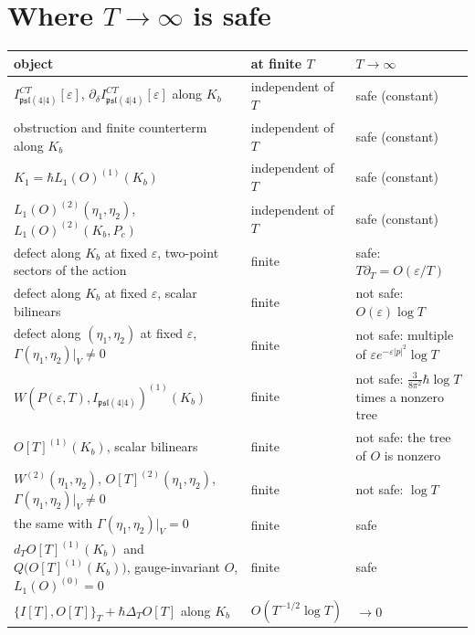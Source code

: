 \section{Where $T\to\infty$ is safe}

\begin{proposition}
\label{prop:kj-Tsafe}
\begin{center}
\begin{tabular}{l|l|l}
object & at finite $T$ & $T\to\infty$ \\
\hline
$I^{CT}_{\mathfrak{psl}(4|4)}[\varepsilon]$, $\partial_\delta I^{CT}_{\mathfrak{psl}(4|4)}[\varepsilon]$ along $K_b$ & independent of $T$ & safe (constant) \\
obstruction and finite counterterm along $K_b$ & independent of $T$ & safe (constant) \\
$K_1=\hbar L_1(O)^{(1)}(K_b)$ & independent of $T$ & safe (constant) \\
$L_1(O)^{(2)}(\eta_1,\eta_2)$, $L_1(O)^{(2)}(K_b,P_c)$ & independent of $T$ & safe (constant) \\
defect along $K_b$ at fixed $\varepsilon$, two-point sectors of the action & finite & safe: $T\partial_T=O(\varepsilon/T)$ \\
defect along $K_b$ at fixed $\varepsilon$, scalar bilinears & finite & not safe: $O(\varepsilon)\log T$ \\
defect along $(\eta_1,\eta_2)$ at fixed $\varepsilon$, $\Gamma(\eta_1,\eta_2)|_V\neq0$ & finite & not safe: multiple of $\varepsilon e^{-\varepsilon|p|^2}\log T$ \\
$W(P(\varepsilon,T),I_{\mathfrak{psl}(4|4)})^{(1)}(K_b)$ & finite & not safe: $\tfrac{3}{8\pi^2}\hbar\log T$ times a nonzero tree \\
$O[T]^{(1)}(K_b)$, scalar bilinears & finite & not safe: the tree of $O$ is nonzero \\
$W^{(2)}(\eta_1,\eta_2)$, $O[T]^{(2)}(\eta_1,\eta_2)$, $\Gamma(\eta_1,\eta_2)|_V\neq0$ & finite & not safe: $\log T$ \\
the same with $\Gamma(\eta_1,\eta_2)|_V=0$ & finite & safe \\
$d_TO[T]^{(1)}(K_b)$ and $Q\big(O[T]^{(1)}(K_b)\big)$, gauge-invariant $O$, $L_1(O)^{(0)}=0$ & finite & safe \\
$\{I[T],O[T]\}_T+\hbar\Delta_TO[T]$ along $K_b$ & $O(T^{-1/2}\log T)$ & $\to0$ \\
\end{tabular}
\end{center}
\end{proposition}

